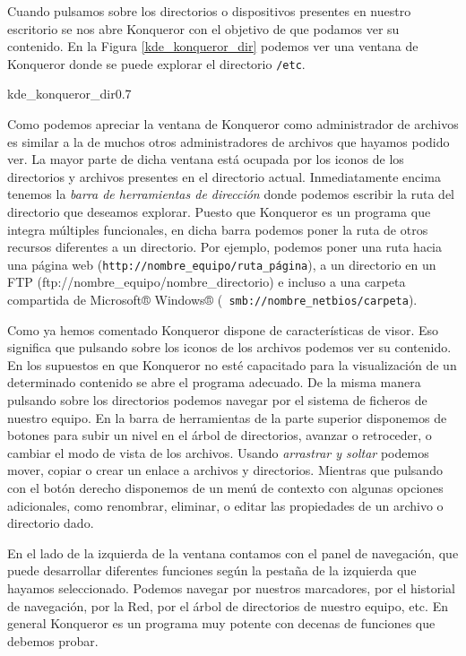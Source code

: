 Cuando  pulsamos sobre  los  directorios o  dispositivos presentes  en
nuestro escritorio se nos abre {\sf  Konqueror} con el objetivo de que
podamos ver su contenido. En la Figura \ref{kde_konqueror_dir} podemos
ver  una  ventana  de  {\sf  Konqueror} donde  se  puede  explorar  el
directorio {\tt /etc}.

\begin{figura}{kde_konqueror_dir}{0.7}
\caption{Konqueror como administrador de archivos}
\label{kde_konqueror_dir}
\end{figura}

Como podemos apreciar la ventana de {\sf Konqueror} como administrador
de  archivos  es   similar  a  la  de   muchos  otros  administradores
de  archivos  que  hayamos  podido   ver.  La  mayor  parte  de  dicha
ventana  está ocupada  por los  iconos de  los directorios  y archivos
presentes en  el directorio  actual. Inmediatamente encima  tenemos la
{\em  barra  de  herramientas  de dirección}  donde  podemos  escribir
la  ruta  del  directorio  que  deseamos  explorar.  Puesto  que  {\sf
Konqueror}  es  un  programa  que integra  múltiples  funcionales,  en
dicha  barra  podemos  poner  la ruta  de  otros  recursos  diferentes
a  un   directorio.  Por  ejemplo,   podemos  poner  una   ruta  hacia
una  página  web   ({\tt  http://nombre\_equipo/ruta\_página}),  a  un
directorio  en  un   FTP  (ftp://nombre\_equipo/nombre\_directorio)  e
incluso  a  una  carpeta   compartida  de  Microsoft®  Windows®  ({\tt
smb://nombre\_netbios/carpeta}).

Como ya hemos comentado {\sf  Konqueror} dispone de características de
visor. Eso  significa que  pulsando sobre los  iconos de  los archivos
podemos ver su  contenido. En los supuestos en que  {\sf Konqueror} no
esté capacitado para  la visualización de un  determinado contenido se
abre  el programa  adecuado. De  la  misma manera  pulsando sobre  los
directorios  podemos navegar  por el  sistema de  ficheros de  nuestro
equipo. En la barra de herramientas de la parte superior disponemos de
botones para  subir un  nivel en  el árbol  de directorios,  avanzar o
retroceder, o  cambiar el modo de  vista de los archivos.  Usando {\em
arrastrar y soltar} podemos mover, copiar o crear un enlace a archivos
y directorios. Mientras  que pulsando con el  botón derecho disponemos
de  un  menú  de  contexto  con  algunas  opciones  adicionales,  como
renombrar,  eliminar,  o  editar  las  propiedades  de  un  archivo  o
directorio dado.

En el  lado de  la izquierda de  la ventana contamos  con el  panel de
navegación,  que  puede  desarrollar  diferentes  funciones  según  la
pestaña de la izquierda que  hayamos seleccionado. Podemos navegar por
nuestros marcadores, por  el historial de navegación, por  la Red, por
el  árbol de  directorios  de  nuestro equipo,  etc.  En general  {\sf
Konqueror} es  un programa  muy potente con  decenas de  funciones que
debemos probar.


